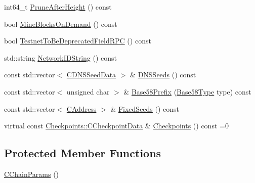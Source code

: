 \begin{DoxyCompactItemize}
\item 
int64\+\_\+t \hyperlink{class_c_chain_params_aed0dc911b1632d46831bf3d5ad82a07d}{Prune\+After\+Height} () const 
\item 
bool \hyperlink{class_c_chain_params_a43391a278460183ece50859c286c46bd}{Mine\+Blocks\+On\+Demand} () const 
\item 
bool \hyperlink{class_c_chain_params_abbad9c090ffa75608cc04edc3c2a0e62}{Testnet\+To\+Be\+Deprecated\+Field\+R\+P\+C} () const 
\item 
std\+::string \hyperlink{class_c_chain_params_a252d329780e7e16f795b8e54f010c8e1}{Network\+I\+D\+String} () const 
\item 
const std\+::vector$<$ \hyperlink{struct_c_d_n_s_seed_data}{C\+D\+N\+S\+Seed\+Data} $>$ \& \hyperlink{class_c_chain_params_a379fef70fd1eea0cbb94442a45224b21}{D\+N\+S\+Seeds} () const 
\item 
const std\+::vector$<$ unsigned char $>$ \& \hyperlink{class_c_chain_params_a6088d3a4f45d89c90e7e6117c3c5720d}{Base58\+Prefix} (\hyperlink{class_c_chain_params_aa294058ec2e3586bd8d03d6c39667058}{Base58\+Type} type) const 
\item 
const std\+::vector$<$ \hyperlink{class_c_address}{C\+Address} $>$ \& \hyperlink{class_c_chain_params_a85e4471025b35c657bbbc8f871361271}{Fixed\+Seeds} () const 
\item 
virtual const \hyperlink{struct_checkpoints_1_1_c_checkpoint_data}{Checkpoints\+::\+C\+Checkpoint\+Data} \& \hyperlink{class_c_chain_params_aba314e7660492aee43812344fa796d6c}{Checkpoints} () const =0
\end{DoxyCompactItemize}
\subsection*{Protected Member Functions}
\begin{DoxyCompactItemize}
\item 
\hyperlink{class_c_chain_params_a8d07fce73d4160244459c5aaae8fb966}{C\+Chain\+Params} ()
\end{DoxyCompactItemize}
